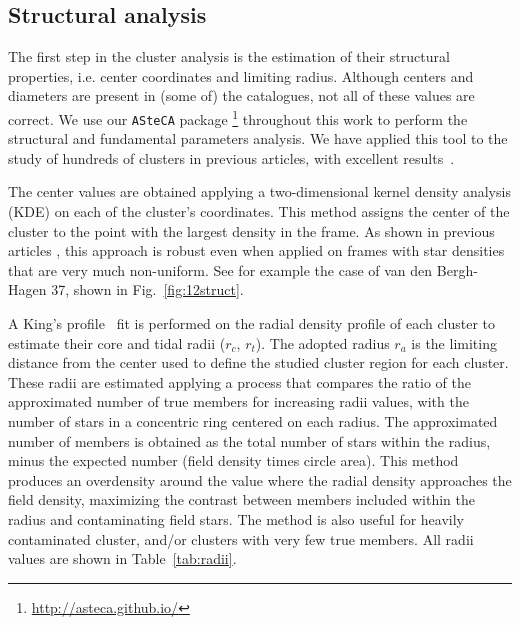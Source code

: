 \documentclass[draft]{aa}
\begin{document}
 \subsection{Structural analysis}
  \label{sec:clust_analy}

  The first step in the cluster analysis is the estimation of their structural
  properties, i.e. center coordinates and limiting radius. Although centers and
  diameters are present in (some of) the catalogues, not all of these values are
  correct. We use our \texttt{ASteCA} package
  \citep{Perren_2015}\footnote{\url{http://asteca.github.io/}} throughout this
  work to perform the structural and fundamental parameters analysis. We have
  applied this tool to the study of hundreds of clusters in previous articles,
  with excellent results~\citep{Perren_2017,Perren_2020}.

  The center values are obtained applying a two-dimensional kernel density
  analysis (KDE) on each of the cluster's coordinates. This method assigns the
  center of the cluster to the point with the largest density in the frame. As
  shown in previous articles \citep{Perren_2015,Perren_2017,Perren_2020}, this
  approach is robust even when applied on frames with star densities that
  are very much non-uniform. See for example the case of van den Bergh-Hagen 37,
  shown in Fig.~\ref{fig:12struct}.

  A King's profile~\citep{King_1962} fit is performed on the radial
  density profile of each cluster to estimate their core and tidal radii
  ($r_{c}$, $r_{t}$). The adopted radius $r_{a}$ is the limiting distance from
  the center used to define the studied cluster region for each cluster. These
  radii are estimated applying a process that compares the ratio of the
  approximated number of true members for increasing radii values, with the
  number of stars in a concentric ring centered on each radius. The
  approximated number of members is obtained as the total number of stars within
  the radius, minus the expected number (field density times circle area). This
  method produces an overdensity around the value where the radial density
  approaches the field density, maximizing the contrast between members included
  within the radius and contaminating field stars. The method is also useful
  for heavily contaminated cluster, and/or clusters with very few true
  members. All radii values are shown in Table~\ref{tab:radii}.\\
\end{document}
